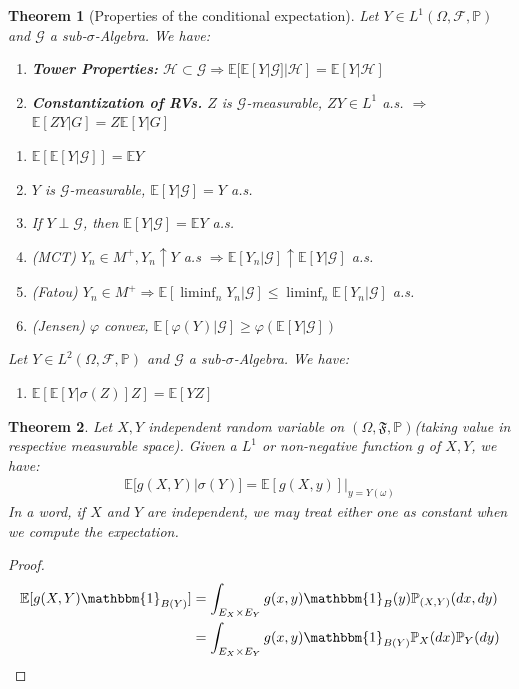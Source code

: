 \documentclass[a4paper,11pt]{book}
\newtheorem{theorem}{Theorem}[section]
\theoremstyle{definition}
\theoremstyle{remark}
\begin{document}
\begin{theorem}[Properties of the conditional expectation]
Let $Y \in L^1(\Omega, \mathcal{F}, \mathbb{P})$ and $\mathcal{G}$ a sub-$\sigma$-Algebra. We have:
\begin{enumerate}
	\item \textbf{Tower Properties: }$\mathcal{H} \subset \mathcal{G} \Rightarrow \mathbb{E}[\mathbb{E}[Y|\mathcal{G}]|\mathcal{H}] = \mathbb{E}[Y|\mathcal{H}]$ 
	\item \textbf{Constantization of RVs.} $Z$ is $\mathcal{G}$-measurable, $ZY \in L^1$ a.s. $\Rightarrow$ $\mathbb{E}[ZY|G] = Z\mathbb{E}[Y|G]$
\end{enumerate}

\begin{enumerate}
	\item $\mathbb{E}[\mathbb{E}[ Y|\mathcal{G}]] = \mathbb{E}Y$  
	\item $Y$ is $\mathcal{G}$-measurable, $\mathbb{E}[Y|\mathcal{G}] = Y$ a.s.
	\item If $Y \perp \mathcal{G}$, then $\mathbb{E}[Y|\mathcal{G}] = \mathbb{E}Y$ a.s.
	\item(MCT) $Y_n \in M^+, Y_n \uparrow Y$ a.s $\Rightarrow \mathbb{E}[Y_n|\mathcal{G}] \uparrow \mathbb{E}[Y| \mathcal{G}]$ a.s.
	\item(Fatou) $Y_n \in M^+ \Rightarrow \mathbb{E}[\liminf_n Y_n|\mathcal{G}] \leq \liminf_n \mathbb{E}[Y_n | \mathcal{G}]$ a.s.
	\item(Jensen) $\varphi$ convex,  $\mathbb{E}[\varphi(Y)|\mathcal{G}] \geq \varphi(\mathbb{E}[Y|\mathcal{G}])$
\end{enumerate}
	Let $Y \in L^2(\Omega, \mathcal{F}, \mathbb{P})$ and $\mathcal{G}$ a sub-$\sigma$-Algebra. We have:
	\begin{enumerate}
		\item $\mathbb{E}[\mathbb{E}[Y|\sigma(Z)]Z] = \mathbb{E}[YZ]$
	\end{enumerate}
\end{theorem}

\begin{theorem}
Let $X, Y$ independent random variable on $(\Omega, \mathfrak{F}, \mathbb{P})$(taking value in respective measurable space). Given a $L^1$ or non-negative function $g$ of $X, Y$, we have:
\begin{align*}
	\mathbb{E}[g(X,Y)|\sigma(Y)] = \mathbb{E}[g(X, y)]|_{y = Y(\omega)}
\end{align*}
In a word, if $X$ and $Y$ are independent, we may treat either one as constant when we compute the expectation.
\end{theorem}
\begin{proof}
	\begin{align*}
		\mathbb{E}[g(X, Y)\mathbbm{1}_{B(Y)}] &= \int_{E_X \times E_Y} g(x, y) \mathbbm{1}_{B}(y)\mathbb{P}_{(X, Y)}(dx, dy)\\
		&= \int_{E_X \times E_Y} g(x, y)\mathbbm{1}_{B(Y)}\mathbb{P}_X(dx)\mathbb{P}_Y(dy)
	\end{align*}
\end{proof}
\end{document}
